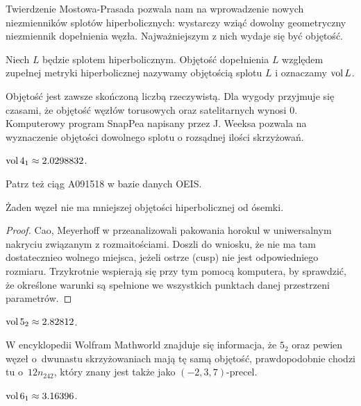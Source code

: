 
Twierdzenie Mostowa-Prasada pozwala nam na wprowadzenie nowych niezmienników splotów hiperbolicznych: wystarczy wziąć dowolny geometryczny niezmiennik dopełnienia węzła.
Najważniejszym z nich wydaje się być objętość.

\begin{definition}[objętość]
    Niech $L$ będzie splotem hiperbolicznym.
    Objętość dopełnienia $L$ względem zupełnej metryki hiperbolicznej nazywamy objętością splotu $L$ i oznaczamy $\operatorname{vol} L$.
\end{definition}

Objętość jest zawsze skończoną liczbą rzeczywistą.
Dla wygody przyjmuje się czasami, że objętość węzłów torusowych oraz satelitarnych wynosi $0$.
Komputerowy program SnapPea napisany przez J. Weeksa pozwala na wyznaczenie objętości dowolnego splotu o rozsądnej ilości skrzyżowań.

\begin{example}
    $\operatorname{vol} 4_1 \approx 2.0298832$.
\end{example}

Patrz też ciąg A091518 w bazie danych OEIS.

\begin{proposition}
    \label{prp:eight_least_hyperbolic}
    Żaden węzeł nie ma mniejszej objętości hiperbolicznej od ósemki.
\end{proposition}

\begin{proof}
    Cao, Meyerhoff w \cite{cao01} przeanalizowali pakowania horokul w uniwersalnym nakryciu związanym z rozmaitościami.
    Doszli do wniosku, że nie ma tam dostatecznieo wolnego miejsca, jeżeli ostrze (cusp) nie jest odpowiedniego rozmiaru.
    Trzykrotnie wspierają się przy tym pomocą komputera, by sprawdzić, że określone warunki są spełnione we wszystkich punktach danej przestrzeni parametrów.
\end{proof}

\begin{example}
    $\operatorname{vol} 5_2 \approx 2.82812$.
\end{example}

W encyklopedii Wolfram Mathworld znajduje się informacja, że $5_2$ oraz pewien węzeł o~dwunastu skrzyżowaniach mają tę samą objętość, prawdopodobnie chodzi tu o~$12n_{242}$, który znany jest także jako $(-2, 3, 7)$-precel. 

\begin{example}
    $\operatorname{vol} 6_1 \approx 3.16396$.
\end{example}

